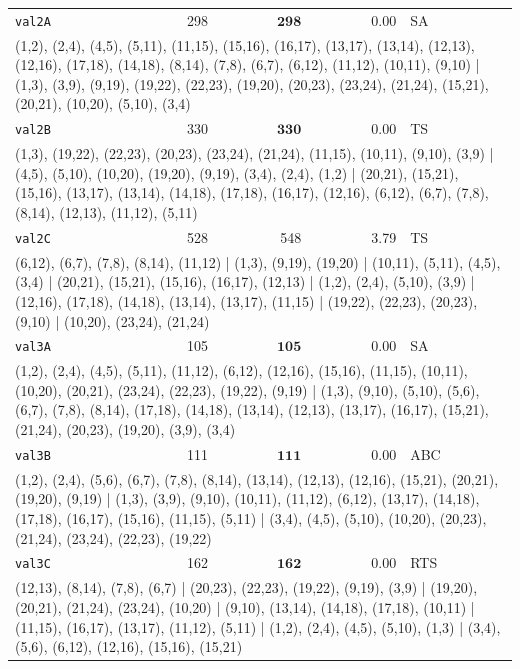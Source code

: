 \begin{longtable}{lrrrl}
\texttt{val2A} & 298 & $\mathbf{298}$ & 0.00 & SA \\
\multicolumn{5}{p{0.96\linewidth}}{\tiny\raggedright\arraybackslash (1,2), (2,4), (4,5), (5,11), (11,15), (15,16), (16,17), (13,17), (13,14), (12,13), (12,16), (17,18), (14,18), (8,14), (7,8), (6,7), (6,12), (11,12), (10,11), (9,10) | (1,3), (3,9), (9,19), (19,22), (22,23), (19,20), (20,23), (23,24), (21,24), (15,21), (20,21), (10,20), (5,10), (3,4)} \\[2pt]
\texttt{val2B} & 330 & $\mathbf{330}$ & 0.00 & TS \\
\multicolumn{5}{p{0.96\linewidth}}{\tiny\raggedright\arraybackslash (1,3), (19,22), (22,23), (20,23), (23,24), (21,24), (11,15), (10,11), (9,10), (3,9) | (4,5), (5,10), (10,20), (19,20), (9,19), (3,4), (2,4), (1,2) | (20,21), (15,21), (15,16), (13,17), (13,14), (14,18), (17,18), (16,17), (12,16), (6,12), (6,7), (7,8), (8,14), (12,13), (11,12), (5,11)} \\[2pt]
\texttt{val2C} & 528 & 548 & 3.79 & TS \\
\multicolumn{5}{p{0.96\linewidth}}{\tiny\raggedright\arraybackslash (6,12), (6,7), (7,8), (8,14), (11,12) | (1,3), (9,19), (19,20) | (10,11), (5,11), (4,5), (3,4) | (20,21), (15,21), (15,16), (16,17), (12,13) | (1,2), (2,4), (5,10), (3,9) | (12,16), (17,18), (14,18), (13,14), (13,17), (11,15) | (19,22), (22,23), (20,23), (9,10) | (10,20), (23,24), (21,24)} \\[2pt]
\texttt{val3A} & 105 & $\mathbf{105}$ & 0.00 & SA \\
\multicolumn{5}{p{0.96\linewidth}}{\tiny\raggedright\arraybackslash (1,2), (2,4), (4,5), (5,11), (11,12), (6,12), (12,16), (15,16), (11,15), (10,11), (10,20), (20,21), (23,24), (22,23), (19,22), (9,19) | (1,3), (9,10), (5,10), (5,6), (6,7), (7,8), (8,14), (17,18), (14,18), (13,14), (12,13), (13,17), (16,17), (15,21), (21,24), (20,23), (19,20), (3,9), (3,4)} \\[2pt]
\texttt{val3B} & 111 & $\mathbf{111}$ & 0.00 & ABC \\
\multicolumn{5}{p{0.96\linewidth}}{\tiny\raggedright\arraybackslash (1,2), (2,4), (5,6), (6,7), (7,8), (8,14), (13,14), (12,13), (12,16), (15,21), (20,21), (19,20), (9,19) | (1,3), (3,9), (9,10), (10,11), (11,12), (6,12), (13,17), (14,18), (17,18), (16,17), (15,16), (11,15), (5,11) | (3,4), (4,5), (5,10), (10,20), (20,23), (21,24), (23,24), (22,23), (19,22)} \\[2pt]
\texttt{val3C} & 162 & $\mathbf{162}$ & 0.00 & RTS \\
\multicolumn{5}{p{0.96\linewidth}}{\tiny\raggedright\arraybackslash (12,13), (8,14), (7,8), (6,7) | (20,23), (22,23), (19,22), (9,19), (3,9) | (19,20), (20,21), (21,24), (23,24), (10,20) | (9,10), (13,14), (14,18), (17,18), (10,11) | (11,15), (16,17), (13,17), (11,12), (5,11) | (1,2), (2,4), (4,5), (5,10), (1,3) | (3,4), (5,6), (6,12), (12,16), (15,16), (15,21)} \\[2pt]

\end{longtable}
